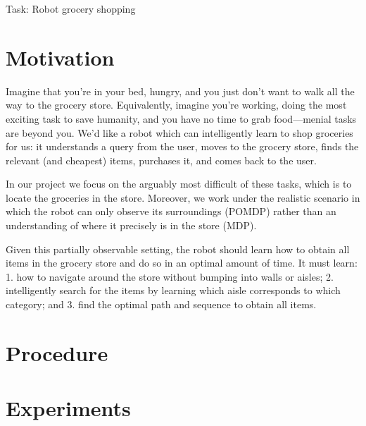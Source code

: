 \documentclass{pset}
\begin{document}

\begin{center}
\Large Task: Robot grocery shopping
\end{center}
\section{Motivation}
\label{sec:motivation}
Imagine that you're in your bed, hungry, and you just don't want to walk
all the way to the grocery store. Equivalently, imagine you're working, doing the
most exciting task to save humanity, and you have no time to grab food---menial
tasks are beyond you. We'd like a robot which can intelligently learn to shop
groceries for us: it understands a query from the user, moves to the
grocery store, finds the relevant (and cheapest) items, purchases it, and comes
back to the user.

In our project we focus on the arguably most difficult of
these tasks, which is to locate the groceries in the store. Moreover, we work
under the realistic
scenario in which the robot can only observe its surroundings (POMDP) rather
than an understanding of where it precisely is in the store (MDP).

Given this partially observable setting, the robot should learn how to obtain
all items in the grocery store and do so in an optimal amount of time. It must
learn: 1. how to navigate around the store without bumping into walls or aisles;
2. intelligently search for the items by learning which aisle corresponds to
which category; and 3. find the optimal path and sequence to obtain all items.

\section{Procedure}
\label{sec:procedure}

\section{Experiments}
\label{sec:experiments}




\end{document}
